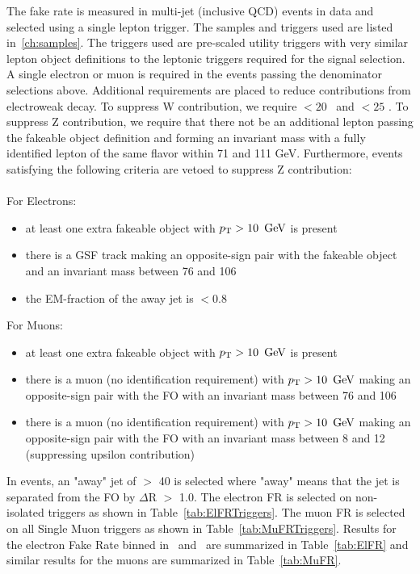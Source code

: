The fake rate is measured in multi-jet (inclusive QCD) events in data and selected using a single lepton trigger. The samples and triggers used are listed in~\ref{ch:samples}. The triggers used are pre-scaled utility triggers with very similar lepton object definitions to the leptonic triggers required for the signal selection. A single electron or muon is required in the events passing the denominator selections above. Additional requirements are placed to reduce contributions from electroweak decay. To suppress W contribution, we require  \MET  $\lt 20$ \GeV \ and \Mt $\lt 25$ \GeV. To suppress Z contribution, we require that there not be an additional lepton passing the fakeable object definition and forming an invariant mass with a fully identified lepton of the same flavor within 71 and 111 GeV. Furthermore, events satisfying the following criteria are vetoed to suppress Z contribution:\\\\
For Electrons:
\begin{itemize}
\item at least one extra fakeable object with $p_{\mathrm{T}} > 10 \ \,\text{Ge\hspace{-.08em}V}$ is present
\item there is a GSF track making an opposite-sign pair with the fakeable object and an invariant mass between 76 and 106 \GeV
\item the EM-fraction of the away jet is $\lt 0.8$
\end{itemize}
For Muons:
\begin{itemize} 
\item at least one extra fakeable object with $p_{\mathrm{T}} > 10 \ \,\text{Ge\hspace{-.08em}V}$ is present
\item there is a muon (no identification requirement) with $p_{\mathrm{T}} > 10 \ \,\text{Ge\hspace{-.08em}V}$ making an opposite-sign pair with 	the FO with an invariant mass between 76 and 106 \GeV
\item there is a muon (no identification requirement) with $p_{\mathrm{T}} > 10 \ \,\text{Ge\hspace{-.08em}V}$ making an opposite-sign pair with the FO with an invariant mass between 8 and 12 \GeV (suppressing upsilon contribution)
\end{itemize}

In events, an "away" jet of \pt $\gt$ 40 \GeV is selected where "away" means that the jet is separated from the FO by $\Delta$R $\gt$ 1.0. The electron FR is selected on non-isolated triggers as shown in Table~\ref{tab:ElFRTriggers}. The muon FR is selected on all Single Muon triggers as shown in Table~\ref{tab:MuFRTriggers}. Results for the electron Fake Rate binned in \pt \ and \aeta \ are summarized in Table~\ref{tab:ElFR} and similar results for the muons are summarized in Table~\ref{tab:MuFR}.\\		
		
